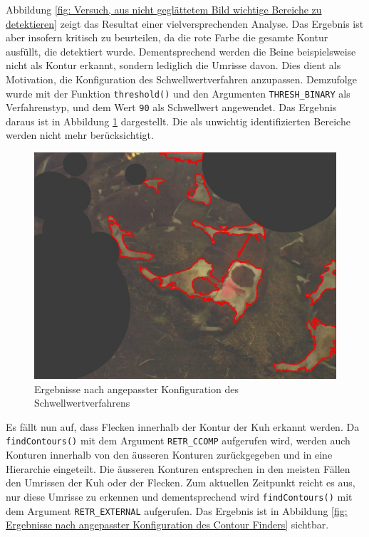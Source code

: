 Abbildung \ref{fig: Versuch, aus nicht geglättetem Bild wichtige Bereiche zu detektieren} zeigt das Resultat einer vielversprechenden Analyse. Das Ergebnis ist aber insofern kritisch zu beurteilen, da die rote Farbe die gesamte Kontur ausfüllt, die detektiert wurde. Dementsprechend werden die Beine beispielsweise nicht als Kontur erkannt, sondern lediglich die Umrisse davon.
Dies dient als Motivation, die Konfiguration des Schwellwertverfahren anzupassen. Demzufolge wurde mit der Funktion \texttt{threshold()} und den Argumenten \texttt{THRESH_BINARY} als Verfahrenstyp, und dem Wert \texttt{90} als Schwellwert angewendet. Das Ergebnis daraus ist in Abbildung \ref{fig: Ergebnisse nach angepasster Konfiguration des Schwellwertverfahrens} dargestellt. Die als unwichtig identifizierten Bereiche werden nicht mehr berücksichtigt.
\begin{figure}[H]
	\center
	\includegraphics[scale=0.43]{Grafiken/entwicklung/12SimpleThresholdingConoturOutlineCCOMP.jpg}
	\caption{Ergebnisse nach angepasster Konfiguration des Schwellwertverfahrens} 
	\label{fig: Ergebnisse nach angepasster Konfiguration des Schwellwertverfahrens} 
\end{figure}
Es fällt nun auf, dass Flecken innerhalb der Kontur der Kuh erkannt werden. Da \texttt{findContours()} mit dem Argument \texttt{RETR_CCOMP} aufgerufen wird, werden auch Konturen innerhalb von den äusseren Konturen zurückgegeben und in eine  Hierarchie eingeteilt. Die äusseren Konturen entsprechen in den meisten Fällen den Umrissen der Kuh oder der Flecken. Zum aktuellen Zeitpunkt reicht es aus, nur diese Umrisse zu erkennen und dementsprechend wird \texttt{findContours()} mit dem Argument \texttt{RETR_EXTERNAL} aufgerufen. Das Ergebnis ist in Abbildung  \ref{fig: Ergebnisse nach angepasster Konfiguration des Contour Finders} sichtbar.
